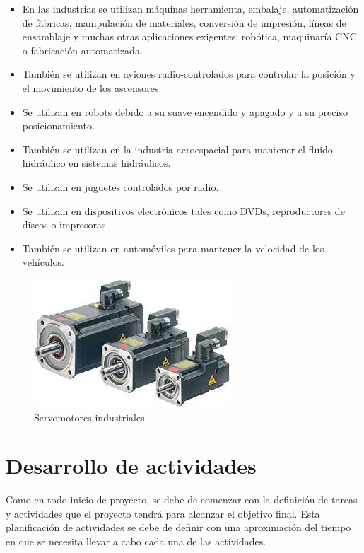 \documentclass[12pt,titlepage]{article}
\begin{document}
\begin{itemize}
\item En las industrias se utilizan máquinas herramienta, embalaje, automatización de fábricas, manipulación de materiales, conversión de impresión, líneas de ensamblaje y muchas otras aplicaciones exigentes; robótica, maquinaría CNC o fabricación automatizada. 
\item También se utilizan en aviones radio-controlados para controlar la posición y el movimiento de los ascensores. 
\item Se utilizan en robots debido a su suave encendido y apagado y a su preciso posicionamiento. 
\item También se utilizan en la industria aeroespacial para mantener el fluido hidráulico en sistemas hidráulicos. 
\item Se utilizan en juguetes controlados por radio. 
\item Se utilizan en dispositivos electrónicos tales como DVDs, reproductores de discos o impresoras. 
\item También se utilizan en automóviles para mantener la velocidad de los vehículos. 
\end{itemize}

\begin{figure}[htbp]
\hspace*{4.2cm} 
\includegraphics[scale=0.70]{servomotores}
\caption{Servomotores industriales}
\end{figure}
\newpage
\section{Desarrollo de actividades}
Como en todo inicio de proyecto, se debe de comenzar con la definición de tareas y actividades que el proyecto tendrá para alcanzar el objetivo final. Esta planificación de actividades se debe de definir con una aproximación del tiempo en que se necesita llevar a cabo cada una de las actividades. \\ \\
\end{document}
